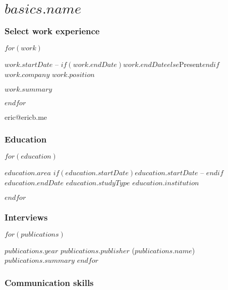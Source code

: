 \documentclass[fontsize=10pt]{tccv}
\begin{document}
\part{$basics.name$}

\section{Select work experience}

\begin{eventlist}
  $for(work)$
\item{$work.startDate$ -- $if(work.endDate)$$work.endDate$$else$Present$endif$}
  {\href{$work.website$}{$work.company$}}
  {$work.position$}

  $work.summary$

  $endfor$

\end{eventlist}

{eric@ericb.me}

\section{Education}

\begin{yearlist}

  $for(education)$
\item[$education.area$]{$if(education.startDate)$$education.startDate$ -- $endif$$education.endDate$}
  {$education.studyType$}
  {$education.institution$}

  $endfor$

\end{yearlist}

\section{Interviews}

\begin{yearlist}

  $for(publications)$
\item{$publications.year$}
  {$publications.publisher$ (\href{$publications.website$}{$publications.name$})}
  {$publications.summary$}
  $endfor$

\end{yearlist}

\section{Communication skills}
\end{document}
